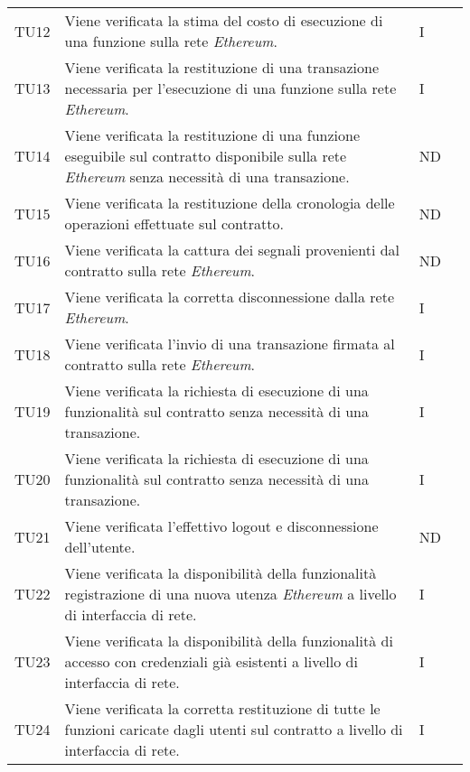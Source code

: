 \begin{longtable}{|C{1.5cm}|C{8cm}|C{3cm}|C{1cm}|}
	TU12 &
	Viene verificata la stima del costo di esecuzione di una funzione sulla rete \textit{Ethereum\glos}.  &
	I \\

	TU13 &
	Viene verificata la restituzione di una transazione necessaria per l'esecuzione di una funzione sulla rete \textit{Ethereum\glo}.  &
	I \\

	TU14 &
	Viene verificata la restituzione di una funzione eseguibile sul contratto disponibile sulla rete \textit{Ethereum\glo} senza necessità di una transazione.  &
	ND \\

	TU15 &
	Viene verificata la restituzione della cronologia delle operazioni effettuate sul contratto.  &
	ND \\

	TU16 &
	Viene verificata la cattura dei segnali provenienti dal contratto sulla rete \textit{Ethereum\glos}.  &
	ND \\

	TU17 &
	Viene verificata la corretta disconnessione dalla rete \textit{Ethereum\glos}.  &
	I \\

	TU18 &
	Viene verificata l'invio di una transazione firmata al contratto sulla rete \textit{Ethereum\glos}.  &
	I \\

	TU19 &
	Viene verificata la richiesta di esecuzione di una funzionalità sul contratto senza necessità di una transazione.  &
	I \\

	TU20 &
	Viene verificata la richiesta di esecuzione di una funzionalità sul contratto senza necessità di una transazione.  &
	I \\

	TU21 &
	Viene verificata l'effettivo logout e disconnessione dell'utente.  &
	ND \\

	TU22 &
	Viene verificata la disponibilità della funzionalità registrazione di una nuova utenza \textit{Ethereum\glo} a livello di interfaccia di rete.  &
	I \\

	TU23 &
	Viene verificata la disponibilità della funzionalità di accesso con credenziali già esistenti a livello di interfaccia di rete.  &
	I \\

	TU24 &
	Viene verificata la corretta restituzione di tutte le funzioni caricate dagli utenti sul contratto a livello di interfaccia di rete.  &
	I \\


\end{longtable}
